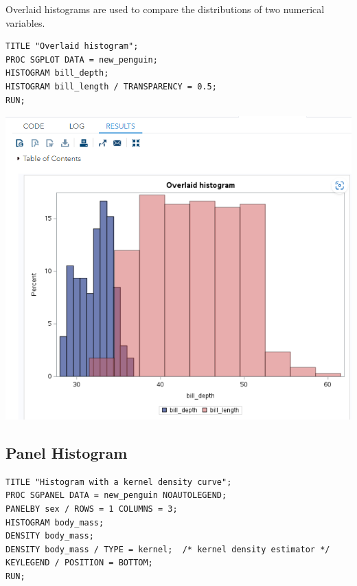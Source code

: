\documentclass[
]{book}
\begin{document}
Overlaid histograms are used to compare the distributions of two numerical variables.

\begin{verbatim}
TITLE "Overlaid histogram";
PROC SGPLOT DATA = new_penguin;
HISTOGRAM bill_depth;
HISTOGRAM bill_length / TRANSPARENCY = 0.5;
RUN;
\end{verbatim}

\begin{center}\includegraphics[width=1\linewidth]{img06/w06-OverLaidHist} \end{center}

\hypertarget{panel-histogram}{%
\subsection{Panel Histogram}\label{panel-histogram}}

\begin{verbatim}
TITLE "Histogram with a kernel density curve";
PROC SGPANEL DATA = new_penguin NOAUTOLEGEND;
PANELBY sex / ROWS = 1 COLUMNS = 3;
HISTOGRAM body_mass;
DENSITY body_mass;
DENSITY body_mass / TYPE = kernel;  /* kernel density estimator */
KEYLEGEND / POSITION = BOTTOM;
RUN;
\end{verbatim}
\end{document}
